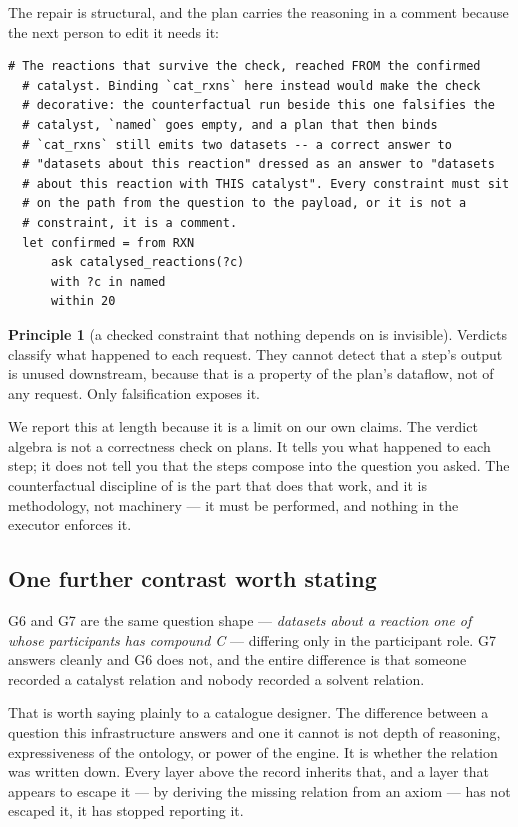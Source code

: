 \documentclass[11pt,a4paper]{article}
\theoremstyle{plain}
\theoremstyle{definition}
\newtheorem{principle}[theorem]{Principle}
\theoremstyle{remark}
\begin{document}
The repair is structural, and the plan carries the reasoning in a
comment because the next person to edit it needs it:

\begin{lstlisting}[style=hfq]
  # The reactions that survive the check, reached FROM the confirmed
  # catalyst. Binding `cat_rxns` here instead would make the check
  # decorative: the counterfactual run beside this one falsifies the
  # catalyst, `named` goes empty, and a plan that then binds
  # `cat_rxns` still emits two datasets -- a correct answer to
  # "datasets about this reaction" dressed as an answer to "datasets
  # about this reaction with THIS catalyst". Every constraint must sit
  # on the path from the question to the payload, or it is not a
  # constraint, it is a comment.
  let confirmed = from RXN
      ask catalysed_reactions(?c)
      with ?c in named
      within 20
\end{lstlisting}

\begin{principle}[a checked constraint that nothing depends on is
invisible]
\label{prin:invisible}
Verdicts classify what happened to each request. They cannot detect
that a step's output is unused downstream, because that is a property
of the plan's dataflow, not of any request. Only falsification exposes
it.
\end{principle}

We report this at length because it is a limit on our own claims. The
verdict algebra is not a correctness check on plans. It tells you what
happened to each step; it does not tell you that the steps compose into
the question you asked. The counterfactual discipline of
 is the part that does that work, and it is
methodology, not machinery --- it must be performed, and nothing in the
executor enforces it.

\subsection{One further contrast worth stating}

G6 and G7 are the same question shape --- \emph{datasets about a
reaction one of whose participants has compound C} --- differing only
in the participant role. G7 answers cleanly and G6 does not, and the
entire difference is that someone recorded a catalyst relation and
nobody recorded a solvent relation.

That is worth saying plainly to a catalogue designer. The difference
between a question this infrastructure answers and one it cannot is
not depth of reasoning, expressiveness of the ontology, or power of the
engine. It is whether the relation was written down. Every layer above
the record inherits that, and a layer that appears to escape it ---
by deriving the missing relation from an axiom --- has not escaped it,
it has stopped reporting it.
\end{document}

